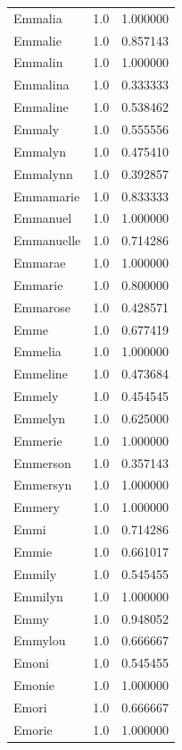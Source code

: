 \documentclass[
  letterpaper,
  DIV=11,
  numbers=noendperiod]{scrreprt}
\begin{document}
\begin{tabular}{lrr}
Emmalia         &   1.0 &   1.000000 \\
Emmalie         &   1.0 &   0.857143 \\
Emmalin         &   1.0 &   1.000000 \\
Emmalina        &   1.0 &   0.333333 \\
Emmaline        &   1.0 &   0.538462 \\
Emmaly          &   1.0 &   0.555556 \\
Emmalyn         &   1.0 &   0.475410 \\
Emmalynn        &   1.0 &   0.392857 \\
Emmamarie       &   1.0 &   0.833333 \\
Emmanuel        &   1.0 &   1.000000 \\
Emmanuelle      &   1.0 &   0.714286 \\
Emmarae         &   1.0 &   1.000000 \\
Emmarie         &   1.0 &   0.800000 \\
Emmarose        &   1.0 &   0.428571 \\
Emme            &   1.0 &   0.677419 \\
Emmelia         &   1.0 &   1.000000 \\
Emmeline        &   1.0 &   0.473684 \\
Emmely          &   1.0 &   0.454545 \\
Emmelyn         &   1.0 &   0.625000 \\
Emmerie         &   1.0 &   1.000000 \\
Emmerson        &   1.0 &   0.357143 \\
Emmersyn        &   1.0 &   1.000000 \\
Emmery          &   1.0 &   1.000000 \\
Emmi            &   1.0 &   0.714286 \\
Emmie           &   1.0 &   0.661017 \\
Emmily          &   1.0 &   0.545455 \\
Emmilyn         &   1.0 &   1.000000 \\
Emmy            &   1.0 &   0.948052 \\
Emmylou         &   1.0 &   0.666667 \\
Emoni           &   1.0 &   0.545455 \\
Emonie          &   1.0 &   1.000000 \\
Emori           &   1.0 &   0.666667 \\
Emorie          &   1.0 &   1.000000 \\

\end{tabular}
\end{document}
